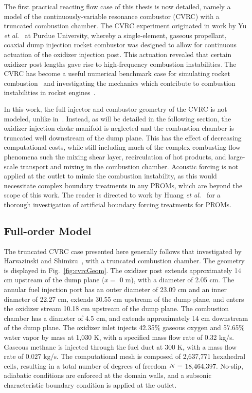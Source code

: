 

The first practical reacting flow case of this thesis is now detailed, namely a model of the continuously-variable resonance combustor (CVRC) with a truncated combustion chamber. The CVRC experiment originated in work by Yu \textit{et al.}~\cite{Yu2008,Yu2009,Yu2012} at Purdue University, whereby a single-element, gaseous propellant, coaxial dump injection rocket combustor was designed to allow for continuous actuation of the oxidizer injection post. This actuation revealed that certain oxidizer post lengths gave rise to high-frequency combustion instabilities. The CVRC has become a useful numerical benchmark case for simulating rocket combustion~\cite{Garby2013,Nguyen2018} and investigating the mechanics which contribute to combustion instabilities in rocket engines~\cite{HarvazinskiCVRCOrig,Harvazinski2016,HarvazinskiCVRCflamelet}.

In this work, the full injector and combustor geometry of the CVRC is not modeled, unlike in~\cite{HarvazinskiCVRCOrig}. Instead, as will be detailed in the following section, the oxidizer injection choke manifold is neglected and the combustion chamber is truncated well downstream of the dump plane. This has the effect of decreasing computational costs, while still including much of the complex combusting flow phenomena such the mixing shear layer, recirculation of hot products, and large-scale transport and mixing in the combustion chamber. Acoustic forcing is not applied at the outlet to mimic the combustion instability, as this would necessitate complex boundary treatments in any PROMs, which are beyond the scope of this work. The reader is directed to work by Huang \textit{et al.}~\cite{Huang2022a} for a thorough investigation of artificial boundary forcing treatments for PROMs.

\subsection{Full-order Model}

The truncated CVRC case presented here generally follows that investigated by Harvazinski and Shimizu~\cite{HarvazinskiCVRCflamelet}, with a truncated combustion chamber. The geometry is displayed in Fig.~\ref{fig:cvrcGeom}. The oxidizer post extends approximately 14 cm upstream of the dump plane ($x = $ 0 m), with a diameter of 2.05 cm. The annular fuel injection port has an outer diameter of 23.09 cm and an inner diameter of 22.27 cm, extends 30.55 cm upstream of the dump plane, and enters the oxidizer stream 10.18 cm upstream of the dump plane. The combustion chamber has a diameter of 4.5 cm, and extends approximately 14 cm downstream of the dump plane. The oxidizer inlet injects 42.35\% gaseous oxygen and 57.65\% water vapor by mass at 1,030 K, with a specified mass flow rate of 0.32 kg/s. Gaseous methane is injected through the fuel duct at 300 K, with a mass flow rate of 0.027 kg/s. The computational mesh is composed of 2,637,771 hexahedral cells, resulting in a total number of degrees of freedom $N =$ 18,464,397. No-slip, adiabatic conditions are enforced at the domain walls, and a subsonic characteristic boundary condition is applied at the outlet.

